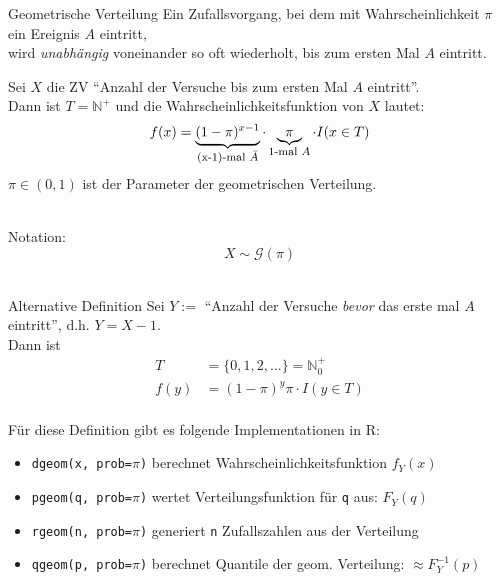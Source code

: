 \documentclass[
  10pt,
  ignorenonframetext,
]{beamer}
\providecommand{\tightlist}{%
  \setlength{\itemsep}{0pt}\setlength{\parskip}{0pt}}
\begin{document}
\begin{frame}{Geometrische Verteilung}
\protect\hypertarget{geometrische-verteilung}{}
Ein Zufallsvorgang, bei dem mit Wahrscheinlichkeit \(\pi\) ein Ereignis
\(A\) eintritt,\\
wird \emph{unabhängig} voneinander so oft wiederholt, bis zum ersten Mal
\(A\) eintritt.

Sei \(X\) die ZV ``Anzahl der Versuche bis zum ersten Mal \(A\)
eintritt''.\\
Dann ist \({T} = \mathbb{N}^+\) und die Wahrscheinlichkeitsfunktion von
\(X\) lautet: \[
f(x) =\underbrace{(1 - \pi)^{x-1}}_{\mbox{\footnotesize  (x-1)-mal $\bar{A}$}}\cdot \underbrace{\pi}_{\mbox{\footnotesize  1-mal $A$}} \cdot I(x \in T)
\] \(\pi \in (0,1)\) ist der Parameter der geometrischen Verteilung.\\
\strut \\

Notation: \[X \sim {\mathcal G}(\pi)\]\\

\end{frame}

\begin{frame}[fragile]{Alternative Definition}
\protect\hypertarget{alternative-definition}{}
Sei \(Y:=\) ``Anzahl der Versuche \emph{bevor} das erste mal \(A\)
eintritt'', d.h. \(Y=X-1\).\\
Dann ist \begin{align*}
T & =  \{0, 1, 2, ... \} = \mathbb{N}_0^+\\
f(y) & =  (1 - \pi)^y  \pi \cdot I(y \in T)
\end{align*}\\

Für diese Definition gibt es folgende Implementationen in R:

\begin{itemize}
\tightlist
\item
  \texttt{dgeom(x,\ prob=}\(\pi\)\texttt{)} berechnet
  Wahrscheinlichkeitsfunktion \(f_Y(x)\)
\item
  \texttt{pgeom(q,\ prob=}\(\pi\)\texttt{)} wertet Verteilungsfunktion
  für \texttt{q} aus: \(F_Y(q)\)
\item
  \texttt{rgeom(n,\ prob=}\(\pi\)\texttt{)} generiert \texttt{n}
  Zufallszahlen aus der Verteilung
\item
  \texttt{qgeom(p,\ prob=}\(\pi\)\texttt{)} berechnet Quantile der geom.
  Verteilung: \(\approx F_Y^{-1}(p)\)
\end{itemize}
\end{frame}
\end{document}
